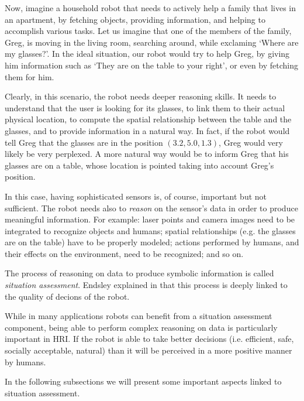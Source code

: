 
Now, imagine a household robot that needs to actively help a family that lives in an apartment, by fetching objects, providing information, and helping to accomplish various tasks. Let us imagine that one of the members of the family, Greg, is moving in the living room, searching around, while exclaming `Where are my glasses?'. In the ideal situation, our robot would try to help Greg, by giving him information such as `They are on the table to your right', or even by fetching them for him. 

Clearly, in this scenario, the robot needs deeper reasoning skills. It needs to understand that the user is looking for its glasses, to link them to their actual physical location, to compute the spatial relationship between the table and the glasses, and to provide information in a natural way. In fact, if the robot would tell Greg that the glasses are in the position $(3.2, 5.0 , 1.3)$, Greg would very likely be very perplexed. A more natural way would be to inform Greg that his glasses are on a table, whose location is pointed taking into account Greg's position.

In this case, having sophisticated sensors is, of course, important but not sufficient. The robot needs also to \textit{reason} on the sensor's data in order to produce meaningful information. For example: laser points and camera images need to be integrated to recognize objects and humans; spatial relationships  (e.g. the glasses are on the table) have to be properly modeled; actions performed by humans, and their effects on the environment, need to be recognized; and so on. 

The process of reasoning on data to produce symbolic information is called \textit{situation assessment}. Endsley explained in \cite{endsley1995toward} that this process is deeply linked to the quality of  decions of the robot.

While in many applications robots can benefit from a situation assessment component, being able to perform complex reasoning on data is particularly important in HRI. If the robot is able to take better decisions (i.e.  efficient, safe, socially acceptable, natural) than it will be perceived in a more positive manner by humans. 

In the following subsections we will present some important aspects linked to situation assessment.

